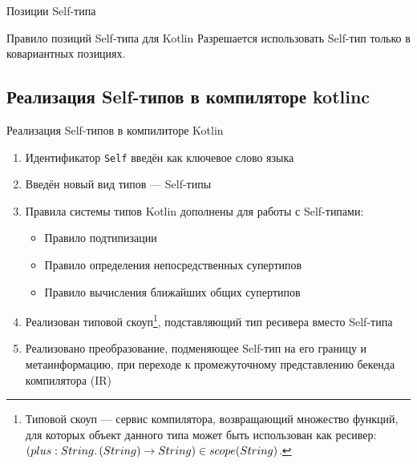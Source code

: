 \documentclass[aspectratio=169,usenames,dvipsnames]{beamer}
\begin{document}
\begin{frame}{Позиции Self-типа}
        \pause

        \begin{block}{Правило позиций Self-типа для Kotlin}
            Разрешается использовать Self-тип только в ковариантных позициях.
        \end{block}
    \end{frame}


    \subsection{Реализация Self-типов в компиляторе kotlinc}

    \begin{frame}{Реализация Self-типов в компилиторе Kotlin}

        \begin{enumerate}
            \item Идентификатор \texttt{Self} введён как ключевое слово языка
            \item Введён новый вид типов --- Self-типы
            \item Правила системы типов Kotlin дополнены для работы с Self-типами:
            \begin{itemize}
                \item Правило подтипизации
                \item Правило определения непосредственных супертипов
                \item Правило вычисления ближайших общих супертипов
            \end{itemize}
            \item Реализован типовой скоуп\footnote{Типовой скоуп --- сервис компилятора, возвращающий множество функций, для которых объект данного типа может быть использован как ресивер: $(plus : String\ldotp(String) \to String) \in scope(String)$.}, подставляющий тип ресивера вместо Self-типа
            \item Реализовано преобразование, подменяющее Self-тип на его границу и метаинформацию, при переходе к промежуточному представлению бекенда компилятора (IR)
        \end{enumerate}
    \end{frame}
\end{document}
